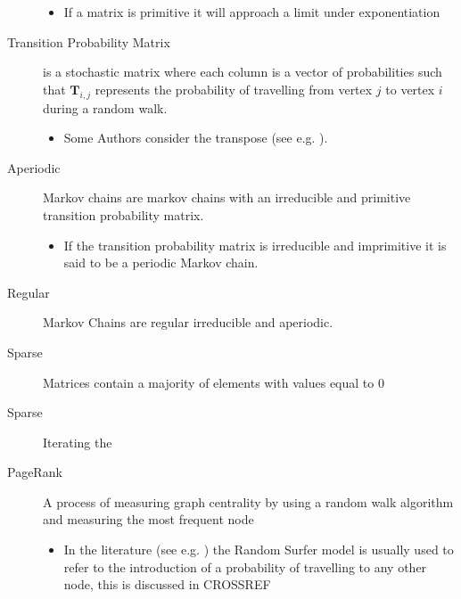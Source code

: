 \documentclass[11pt]{article}
\begin{document}
\begin{description}
\begin{itemize}
\item If a matrix is primitive it will approach a limit under exponentiation \cite[]{langvilleGooglePageRankScience2012}
\end{itemize}
\item[{Transition Probability Matrix}] is a stochastic matrix where each column is a vector of probabilities such that \(\mathbf{T}_{i,j}\) represents the probability of travelling from vertex \(j\) to vertex \(i\) during a random walk.
\begin{itemize}
\item Some Authors consider the transpose (see e.g. \cite{langvilleGooglePageRankScience2012}).
\end{itemize}
\item[{Aperiodic}] Markov chains are markov chains with an irreducible and primitive transition probability matrix.
\begin{itemize}
\item If the transition probability matrix is irreducible and imprimitive it is said to be a periodic Markov chain.
\end{itemize}
\item[{Regular}] Markov Chains are regular irreducible and aperiodic.
\item[{Sparse}] Matrices contain a majority of elements with values equal to 0 \cite[]{langvilleGooglePageRankScience2012}
\item[{Sparse}] Iterating the
\item[{PageRank}] A process of measuring graph centrality by using a random walk algorithm and measuring the most frequent node
\begin{itemize}
\item In the literature (see e.g. \cite{guptaWTFWhoFollow2013,langvilleGooglePageRankScience2012}) the Random Surfer model is usually used to refer to the introduction of a probability of travelling to any other node, this is discussed in CROSSREF
\end{itemize}
\end{description}
\end{document}
